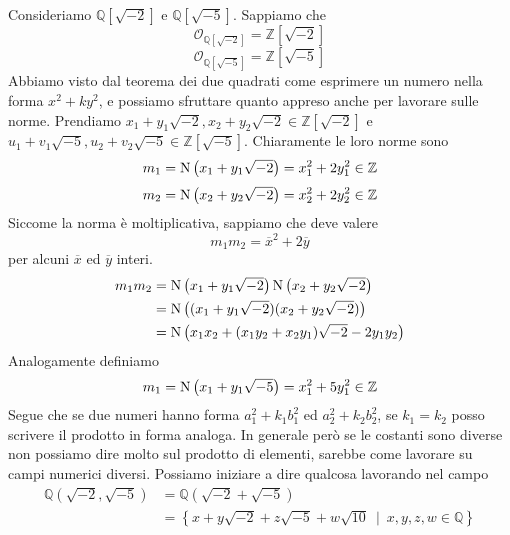 \label{lezione20}
\begin{esempio}
	Consideriamo $\mathbb{Q}[\sqrt{-2}]$ e $\mathbb{Q}[\sqrt{-5}]$. Sappiamo che 
	\begin{equation*}
	\mathcal{O}_{\mathbb{Q}[\sqrt{-2}]}=\mathbb{Z}[\sqrt{-2}]
	\end{equation*}
	\begin{equation*}
	\mathcal{O}_{\mathbb{Q}[\sqrt{-5}]}=\mathbb{Z}[\sqrt{-5}]
	\end{equation*}
	Abbiamo visto dal teorema dei due quadrati come esprimere un numero nella forma $x^2+ky^2$, e possiamo sfruttare quanto appreso anche per lavorare sulle norme.
	Prendiamo $x_1+y_1\sqrt{-2},x_2+y_2\sqrt{-2}\in\mathbb{Z}[\sqrt{-2}]$ e $u_1+v_1\sqrt{-5},u_2+v_2\sqrt{-5}\in\mathbb{Z}[\sqrt{-5}]$. Chiaramente le loro norme sono
	\begin{equation*}
	m_1=\operatorname{N}\left(x_1+y_1\sqrt{-2}\right)=x_1^2+2y_1^2\in\mathbb{Z}
	\end{equation*}
	\begin{equation*}
	m_2=\operatorname{N}\left(x_2+y_2\sqrt{-2}\right)=x_2^2+2y_2^2\in\mathbb{Z}
	\end{equation*}
	Siccome la norma è moltiplicativa, sappiamo che deve valere 
	\begin{equation*}
	m_1m_2=\overline{x}^2+2\overline{y}
	\end{equation*}
	per alcuni $\overline{x}$ ed $\overline{y}$ interi.
	\begin{align*}
	m_1m_2
	&=\operatorname{N}\left(x_1+y_1\sqrt{-2}\right)\operatorname{N}\left(x_2+y_2\sqrt{-2}\right)\\
	&=\operatorname{N}\left((x_1+y_1\sqrt{-2})(x_2+y_2\sqrt{-2})\right)\\
	&=\operatorname{N}\left(x_1x_2+(x_1y_2+x_2y_1)\sqrt{-2}-2y_1y_2\right)
	\end{align*}
	Analogamente definiamo
	\begin{equation*}
	m_1=\operatorname{N}\left(x_1+y_1\sqrt{-5}\right)=x_1^2+5y_1^2\in\mathbb{Z}
	\end{equation*}
	Segue che se due numeri hanno forma $a_1^2+k_1b_1^2$ ed $a_2^2+k_2b_2^2$, se $k_1=k_2$ posso scrivere il prodotto in forma analoga. In generale però se le costanti sono diverse non possiamo dire molto sul prodotto di elementi, sarebbe come lavorare su campi numerici diversi. Possiamo iniziare a dire qualcosa lavorando nel campo 
	\begin{align*}
	\mathbb{Q}\left(\sqrt{-2},\sqrt{-5}\right)
	&=\mathbb{Q}\left(\sqrt{-2}+\sqrt{-5}\right)\\
	&=\left\{x+y\sqrt{-2}+z\sqrt{-5}+w\sqrt{10}\ \mid \ x,y,z,w\in\mathbb{Q}\right\}

\end{align*}
\end{esempio}
